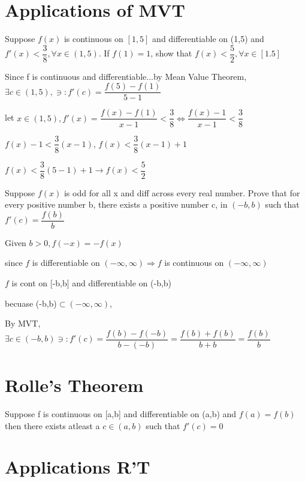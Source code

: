 \documentclass{article}
\begin{document}
\pagebreak

\text{}

\section{Applications of MVT}

Suppose $f(x)$ is continuous on $[1,5]$ and differentiable on (1,5) and $f'(x) < \dfrac{3}{8}, \forall x \in (1,5)$. If $f(1) = 1$, show that $f(x) < \dfrac{5}{2}, \forall x \in [1.5]$

Since f is continuous and differentiable...by Mean Value Theorem, $\exists c \in (1,5), \ni: f'(c) = \dfrac{f(5) - f(1)}{5-1}$

let $x \in (1,5), f'(x) = \dfrac{f(x) - f(1)}{x-1} < \dfrac{3}{8} \Longleftrightarrow \dfrac{f(x) - 1}{x - 1} < \dfrac{3}{8}$

$f(x) - 1 < \dfrac{3}{8}(x - 1)$, $f(x) < \dfrac{3}{8} (x-1) + 1$

$f(x) < \dfrac{3}{8}(5 - 1) + 1 \rightarrow f(x) < \dfrac{5}{2}$ 

\vspace{1cm}

Suppose $f(x)$ is odd for all x and diff across every real number. Prove that for every positive number b, there exists a positive number c, in $(-b,b)$ such that $f'(c) = \dfrac{f(b)}{b}$

Given $b > 0, f(-x) = - f(x)$

since $f$ is differentiable on $(-\infty,\infty) \Longrightarrow f $ is continuous on $(-\infty,\infty)$

$f$ is cont on [-b,b] and differentiable on (-b,b)

becuase (-b,b)$\subset(-\infty, \infty)$,

By MVT, $\exists c \in (-b , b) \ni: f'(c) = \dfrac{f(b) - f(-b)}{b - (-b)} = \dfrac{f(b) + f(b)}{b + b} = \dfrac{f(b)}{b}$

\section{Rolle's Theorem}

Suppose f is continuous on [a,b] and differentiable on (a,b) and $f(a) = f(b)$ then there exists atleast a $c \in (a,b)$ such that $f'(c) = 0$

\section{Applications R'T}
\end{document}
